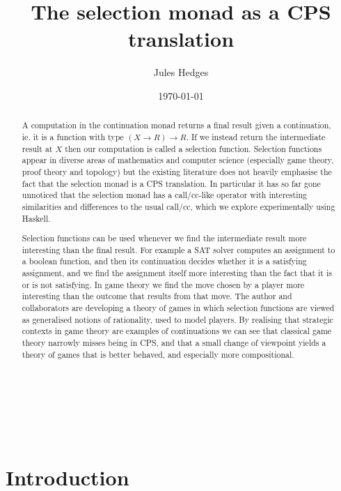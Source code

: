 \documentclass{article}
\title{The selection monad as a CPS translation}
\author{Jules Hedges}
\date\today
\begin{document}
\pagestyle{plain}


\maketitle
\begin{abstract}\noindent
A computation in the continuation monad returns a final result given a continuation, ie. it is a function with type $(X \to R) \to R$. If we instead return the intermediate result at $X$ then our computation is called a selection function. Selection functions appear in diverse areas of mathematics and computer science (especially game theory, proof theory and topology) but the existing literature does not heavily emphasise the fact that the selection monad is a CPS translation. In particular it has so far gone unnoticed that the selection monad has a call/cc-like operator with interesting similarities and differences to the usual call/cc, which we explore experimentally using Haskell.

Selection functions can be used whenever we find the intermediate result more interesting than the final result. For example a SAT solver computes an assignment to a boolean function, and then its continuation decides whether it is a satisfying assignment, and we find the assignment itself more interesting than the fact that it is or is not satisfying. In game theory we find the move chosen by a player more interesting than the outcome that results from that move. The author and collaborators are developing a theory of games in which selection functions are viewed as generalised notions of rationality, used to model players. By realising that strategic contexts in game theory are examples of continuations we can see that classical game theory narrowly misses being in CPS, and that a small change of viewpoint yields a theory of games that is better behaved, and especially more compositional.
\end{abstract}

\clearpage

\ 

\vfill 

\tableofcontents

\vfill 

\ 

\clearpage




\section{Introduction}
\end{document}
